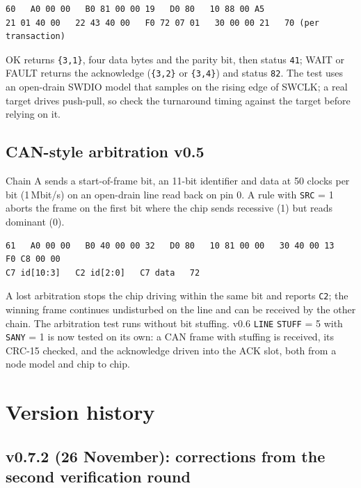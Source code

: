\documentclass[11pt,a4paper]{article}
\newcommand{\vfive}{\textcolor{fivec}{\textsf{\small v0.5}}}
\newcommand{\vsix}{\textcolor{sixc}{\textsf{\small v0.6}}}
\newcommand{\sig}[1]{\texttt{#1}}
\begin{document}
\begin{lstlisting}
60   A0 00 00   B0 81 00 00 19   D0 80   10 88 00 A5
21 01 40 00   22 43 40 00   F0 72 07 01   30 00 00 21   70 (per transaction)
\end{lstlisting}

OK returns \texttt{\{3,1\}}, four data bytes and the parity bit, then status \texttt{41}; WAIT or FAULT returns the acknowledge (\texttt{\{3,2\}} or \texttt{\{3,4\}}) and status \texttt{82}. The test uses an open-drain SWDIO model that samples on the rising edge of SWCLK; a real target drives push-pull, so check the turnaround timing against the target before relying on it.

\subsection{CAN-style arbitration \vfive}

Chain A sends a start-of-frame bit, an 11-bit identifier and data at 50 clocks per bit (1\,Mbit/s) on an open-drain line read back on pin 0. A rule with \sig{SRC} = 1 aborts the frame on the first bit where the chip sends recessive (1) but reads dominant (0).

\begin{lstlisting}
61   A0 00 00   B0 40 00 00 32   D0 80   10 81 00 00   30 40 00 13   F0 C8 00 00
C7 id[10:3]   C2 id[2:0]   C7 data   72
\end{lstlisting}

A lost arbitration stops the chip driving within the same bit and reports \texttt{C2}; the winning frame continues undisturbed on the line and can be received by the other chain. The arbitration test runs without bit stuffing. \vsix{} \sig{LINE} \sig{STUFF} = 5 with \sig{SANY} = 1 is now tested on its own: a CAN frame with stuffing is received, its CRC-15 checked, and the acknowledge driven into the ACK slot, both from a node model and chip to chip.

\section{Version history}\label{sec:history}

\subsection{v0.7.2 (26 November): corrections from the second verification round}
\end{document}
